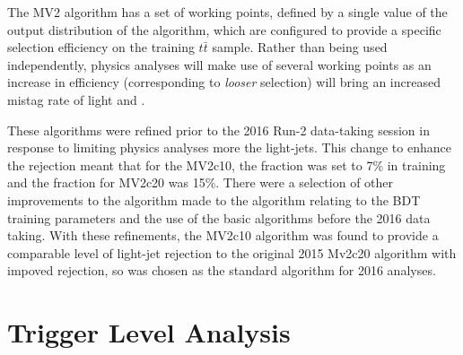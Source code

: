 	The MV2 algorithm has a set of working points, defined by a single value of the output distribution of the algorithm, which are configured to provide a specific \bjet selection efficiency on the training $t\bar{t}$ sample. Rather than being used independently, physics analyses will make use of several working points as an increase in \bjet efficiency (corresponding to \textit{looser} \bjet selection) will bring an increased mistag rate of light and \cjets.
	
	These algorithms were refined prior to the 2016 Run-2 data-taking session in response to \cjets limiting physics analyses more the light-jets. This change  to enhance the \cjet rejection meant that for the MV2c10, the \cjet fraction was set to 7\% in training and the fraction for MV2c20 was 15\%. There were a selection of other improvements to the algorithm made to the algorithm relating to the BDT training parameters and the use of the basic algorithms before the 2016 data taking. With these refinements, the MV2c10 algorithm was found to provide a comparable level of light-jet rejection to the original 2015 Mv2c20 algorithm with impoved \cjet rejection, so was chosen as the standard \btagging algorithm for 2016 analyses. \cite{btagOptimisation}
	
	
\section{Trigger Level Analysis}
	
	
\endinput
